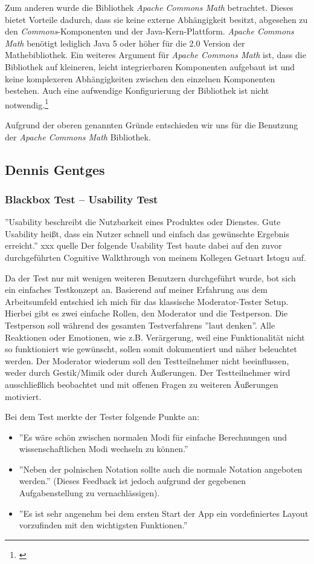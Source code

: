Zum anderen wurde die Bibliothek \textit{Apache Commons Math} betrachtet. Dieses bietet Vorteile dadurch, dass sie keine externe Abhängigkeit besitzt, abgesehen zu den \textit{Commons}-Komponenten und der Java-Kern-Plattform. \textit{Apache Commons Math} benötigt lediglich Java 5 oder höher für die 2.0 Version der Mathebibliothek. Ein weiteres Argument für \textit{Apache Commons Math} ist, dass die Bibliothek auf kleineren, leicht integrierbaren Komponenten aufgebaut ist und keine komplexeren Abhängigkeiten zwischen den einzelnen Komponenten bestehen. Auch eine aufwendige Konfigurierung der Bibliothek ist nicht notwendig.\footnote{\cite[vgl.][]{Apache2016}}

Aufgrund der oberen genannten Gründe entschieden wir uns für die Benutzung der \textit{Apache Commons Math} Bibliothek.

\clearpage

\subsection{Dennis Gentges}

\subsubsection{Blackbox Test – Usability Test}

''Usability beschreibt die Nutzbarkeit eines Produktes oder Dienstes. Gute Usability heißt, dass ein Nutzer schnell und einfach das gewünschte Ergebnis erreicht.'' xxx quelle 
Der folgende Usability Test baute dabei auf den zuvor durchgeführten Cognitive Walkthrough von meinem Kollegen Getuart Istogu auf.

Da der Test nur mit wenigen weiteren Benutzern durchgeführt wurde, bot sich ein einfaches Testkonzept an. Basierend auf meiner Erfahrung aus dem Arbeitsumfeld entschied ich mich für das klassische Moderator-Tester Setup. Hierbei gibt es zwei einfache Rollen, den Moderator und die Testperson. Die Testperson soll während des gesamten Testverfahrens ''laut denken''. Alle Reaktionen oder Emotionen, wie z.B. Verärgerung, weil eine Funktionalität nicht so funktioniert wie gewünscht, sollen somit dokumentiert und näher beleuchtet werden. Der Moderator wiederum soll den Testteilnehmer nicht beeinflussen, weder durch Gestik/Mimik oder durch Äußerungen. Der Testteilnehmer wird ausschließlich beobachtet und mit offenen Fragen zu weiteren Äußerungen motiviert. 

Bei dem Test merkte der Tester folgende Punkte an:
\begin{itemize}
	\item ''Es wäre schön zwischen normalen Modi für einfache Berechnungen und wissenschaftlichen Modi wechseln zu können.''
	\item ''Neben der polnischen Notation sollte auch die normale Notation angeboten werden.'' (Dieses Feedback ist jedoch aufgrund der gegebenen Aufgabenstellung zu vernachlässigen).
	\item ''Es ist sehr angenehm bei dem ersten Start der App ein vordefiniertes Layout vorzufinden mit den wichtigsten Funktionen.''
\end{itemize}

